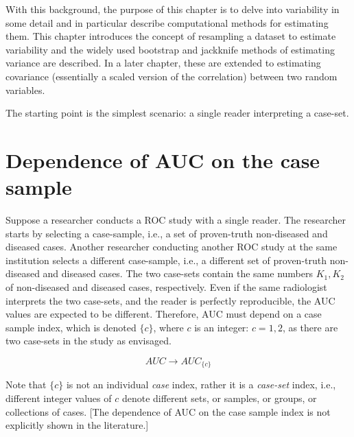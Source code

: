 \documentclass[
]{book}
\begin{document}
With this background, the purpose of this chapter is to delve into variability in some detail and in particular describe computational methods for estimating them. This chapter introduces the concept of resampling a dataset to estimate variability and the widely used bootstrap and jackknife methods of estimating variance are described. In a later chapter, these are extended to estimating covariance (essentially a scaled version of the correlation) between two random variables.

The starting point is the simplest scenario: a single reader interpreting a case-set.

\hypertarget{dependence-of-auc-on-the-case-sample}{%
\section{Dependence of AUC on the case sample}\label{dependence-of-auc-on-the-case-sample}}

Suppose a researcher conducts a ROC study with a single reader. The researcher starts by selecting a case-sample, i.e., a set of proven-truth non-diseased and diseased cases. Another researcher conducting another ROC study at the same institution selects a different case-sample, i.e., a different set of proven-truth non-diseased and diseased cases. The two case-sets contain the same numbers \(K_1,K_2\) of non-diseased and diseased cases, respectively. Even if the same radiologist interprets the two case-sets, and the reader is perfectly reproducible, the AUC values are expected to be different. Therefore, AUC must depend on a case sample index, which is denoted \(\{c\}\), where \(c\) is an integer: \(c = 1, 2\), as there are two case-sets in the study as envisaged.

\begin{equation} 
AUC\rightarrow AUC_{\{c\}}
\label{eq:sources-of-variability-case-set}
\end{equation}

Note that \(\{c\}\) is not an individual \emph{case} index, rather it is a \emph{case-set} index, i.e., different integer values of \(c\) denote different sets, or samples, or groups, or collections of cases. {[}The dependence of AUC on the case sample index is not explicitly shown in the literature.{]}
\end{document}
